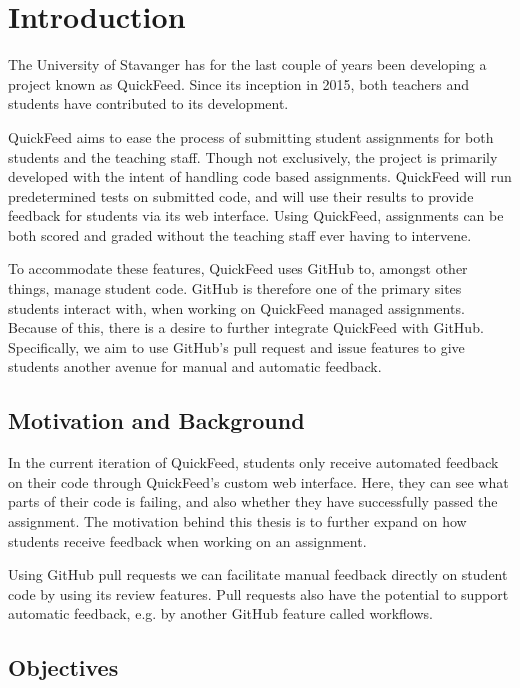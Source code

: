 
\chapter{Introduction}
\label{ch:intro}

The University of Stavanger has for the last couple of years been developing a project known as QuickFeed.
Since its inception in 2015, both teachers and students have contributed to its development. %

QuickFeed aims to ease the process of submitting student assignments for both students and the teaching staff.
Though not exclusively, the project is primarily developed with the intent of handling code based assignments.
QuickFeed will run predetermined tests on submitted code, and will use their results to provide feedback for students via its web interface.
Using QuickFeed, assignments can be both scored and graded without the teaching staff ever having to intervene.

To accommodate these features, QuickFeed uses GitHub to, amongst other things, manage student code.
GitHub is therefore one of the primary sites students interact with, when working on QuickFeed managed assignments.
Because of this, there is a desire to further integrate QuickFeed with GitHub.
Specifically, we aim to use GitHub's pull request and issue features to give students another avenue for manual and automatic feedback.

\section{Motivation and Background}
\label{sec:motivation}

In the current iteration of QuickFeed, students only receive automated feedback on their code through QuickFeed's custom web interface.
Here, they can see what parts of their code is failing, and also whether they have successfully passed the assignment.
The motivation behind this thesis is to further expand on how students receive feedback when working on an assignment.

Using GitHub pull requests we can facilitate manual feedback directly on student code by using its review features.
Pull requests also have the potential to support automatic feedback, e.g. by another GitHub feature called workflows.

\section{Objectives}

